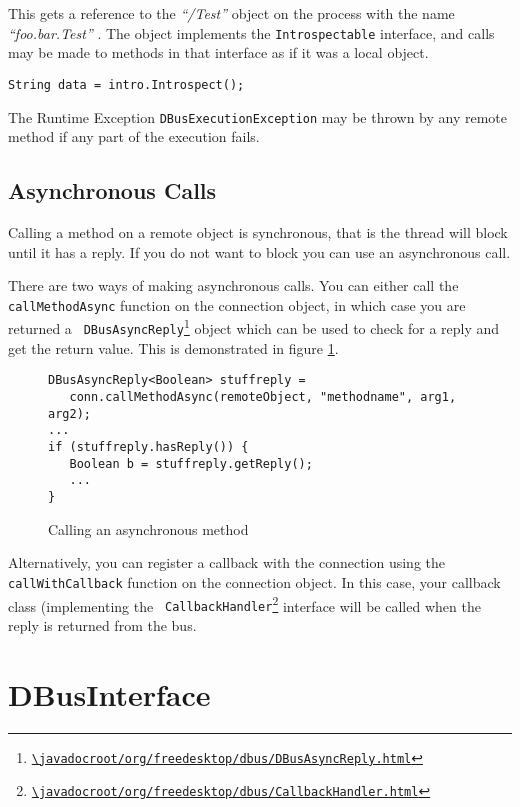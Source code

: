 \documentclass[a4paper,12pt]{article}
\begin{document}
This gets a reference to the {\em ``/Test''} object on the process with the
name {\em ``foo.bar.Test''} . The object implements the {\tt Introspectable}
interface, and calls may be made to methods in that interface as if it was a
local object.

\begin{verbatim}
String data = intro.Introspect();
\end{verbatim}

The Runtime Exception {\tt DBusExecutionException} may be thrown
by any remote method if any part of the execution fails.

\subsection{Asynchronous Calls}

Calling a method on a remote object is synchronous, that is the thread will
block until it has a reply. If you do not want to block you can use an
asynchronous call.

There are two ways of making asynchronous calls. You can either call the {\tt
callMethodAsync} function on the connection object, in which case you are
returned a {\tt
DBusAsyncReply\footnote{\url{\javadocroot/org/freedesktop/dbus/DBusAsyncReply.html}}}
object which can be used to check for a reply and get the return value.  This
is demonstrated in figure \ref{fig:async}.

\begin{figure}[htb]
\begin{center}
\begin{verbatim}
DBusAsyncReply<Boolean> stuffreply = 
   conn.callMethodAsync(remoteObject, "methodname", arg1, arg2);
...
if (stuffreply.hasReply()) {
   Boolean b = stuffreply.getReply();
   ...
}
\end{verbatim}
\end{center}
\caption{Calling an asynchronous method}
\label{fig:async}
\end{figure}

Alternatively, you can register a callback with the connection using the {\tt
callWithCallback} function on the connection object. In this case, your
callback class (implementing the {\tt
CallbackHandler\footnote{\url{\javadocroot/org/freedesktop/dbus/CallbackHandler.html}}}
interface will be called when the reply is returned from the bus.

\section{DBusInterface}
\end{document}
